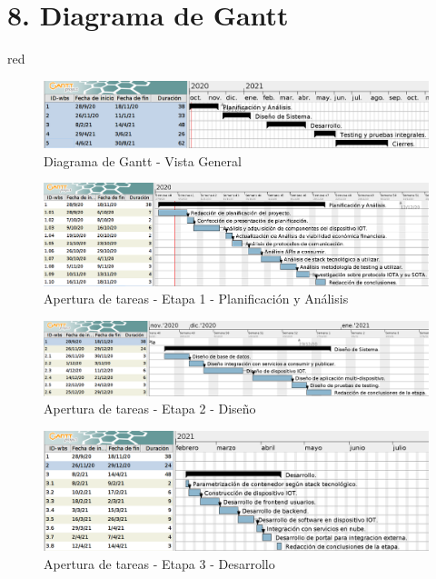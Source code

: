 \documentclass[11pt]{charter}
\begin{document}
\section{8. Diagrama de Gantt}
\label{sec:gantt}

\begin{consigna}{red}
\begin{figure}[htpb]
\centering 
\includegraphics[width=.8\textwidth]{./Figuras/gantgeneral.png}
\caption{Diagrama de Gantt - Vista General}
\label{fig:GanttGeneral}
\end{figure}

\begin{figure}[htpb]
\centering 
\includegraphics[width=.8\textwidth]{./Figuras/PlayAna.png}
\caption{Apertura de tareas - Etapa 1 - Planificación y Análisis}
\label{fig:GanttEtapa1}
\end{figure}

\begin{figure}[htpb]
\centering 
\includegraphics[width=.8\textwidth]{./Figuras/disenio.png}
\caption{Apertura de tareas - Etapa 2 - Diseño}
\label{fig:GanttEtapa2}
\end{figure}

\begin{figure}[htpb]
\centering 
\includegraphics[width=.8\textwidth]{./Figuras/desarrollo.png}
\caption{Apertura de tareas - Etapa 3 - Desarrollo}
\label{fig:GanttEtapa4}
\end{figure}


\end{consigna}
\end{document}
